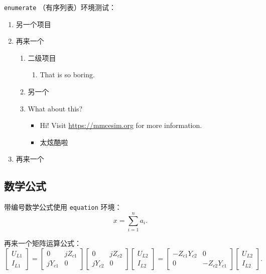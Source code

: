 \texttt{enumerate} （有序列表）环境测试：
\begin{enumerate}
  \item 另一个项目
  \item 再来一个
  \begin{enumerate}
    \item 二级项目
    \begin{enumerate}
      \item That is so boring.
    \end{enumerate}
    \item 另一个
    \item What about this?
    \begin{itemize}
      \item Hi! Visit \url{https://mmcesim.org} for more information.
      \item 太炫酷啦
    \end{itemize}
  \end{enumerate}
  \item 再来一个
\end{enumerate}

\subsection{数学公式}

带编号数学公式使用 \texttt{equation} 环境：
\begin{equation}\label{eq:demo:sum}
  x=\sum_{i=1}^{n}a_i.
\end{equation}

再来一个矩阵运算公式：
\begin{equation}
  \begin{bmatrix}
    U_{L1}\\I_{L1}
  \end{bmatrix}
  =
  \begin{bmatrix}
    0&jZ_{c1}\\jY_{c1}&0
  \end{bmatrix}
  \begin{bmatrix}
    0&jZ_{c2}\\jY_{c2}&0
  \end{bmatrix}
  \begin{bmatrix}
    U_{L2}\\I_{L2}
  \end{bmatrix}
  =
  \begin{bmatrix}
    -Z_{c1}Y_{c2}&0\\0&-Z_{c2}Y_{c1}
  \end{bmatrix}
  \begin{bmatrix}
    U_{L2}\\I_{L2}
  \end{bmatrix}.
\end{equation}

